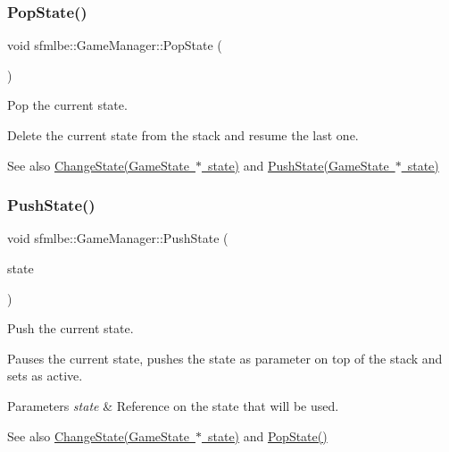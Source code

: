 \subsubsection{\texorpdfstring{Pop\+State()}{PopState()}}
{\footnotesize\ttfamily void sfmlbe\+::\+Game\+Manager\+::\+Pop\+State (\begin{DoxyParamCaption}{ }\end{DoxyParamCaption})}



Pop the current state. 

Delete the current state from the stack and resume the last one. \begin{DoxySeeAlso}{See also}
\mbox{\hyperlink{classsfmlbe_1_1_game_manager_a7bb485f2b11da154da6b3a2d1fa0860f}{Change\+State(\+Game\+State $\ast$ state)}} and \mbox{\hyperlink{classsfmlbe_1_1_game_manager_a63e4a2e13a8ce27e1c394fa942212dc1}{Push\+State(\+Game\+State $\ast$ state)}} 
\end{DoxySeeAlso}
\mbox{\label{classsfmlbe_1_1_game_manager_a63e4a2e13a8ce27e1c394fa942212dc1}} 
\subsubsection{\texorpdfstring{Push\+State()}{PushState()}}
{\footnotesize\ttfamily void sfmlbe\+::\+Game\+Manager\+::\+Push\+State (\begin{DoxyParamCaption}\item[{\mbox{\hyperlink{classsfmlbe_1_1_game_state}{Game\+State}} $\ast$}]{state }\end{DoxyParamCaption})}



Push the current state. 

Pauses the current state, pushes the state as parameter on top of the stack and sets as active. 
\begin{DoxyParams}{Parameters}
{\em state} & Reference on the state that will be used. \\
\hline
\end{DoxyParams}
\begin{DoxySeeAlso}{See also}
\mbox{\hyperlink{classsfmlbe_1_1_game_manager_a7bb485f2b11da154da6b3a2d1fa0860f}{Change\+State(\+Game\+State $\ast$ state)}} and \mbox{\hyperlink{classsfmlbe_1_1_game_manager_a2c80186d2de5b168900bb91b05eb11ee}{Pop\+State()}} 
\end{DoxySeeAlso}
\mbox{\label{classsfmlbe_1_1_game_manager_a17d8f897440b021f4eb1884cb3a5d521}} 
